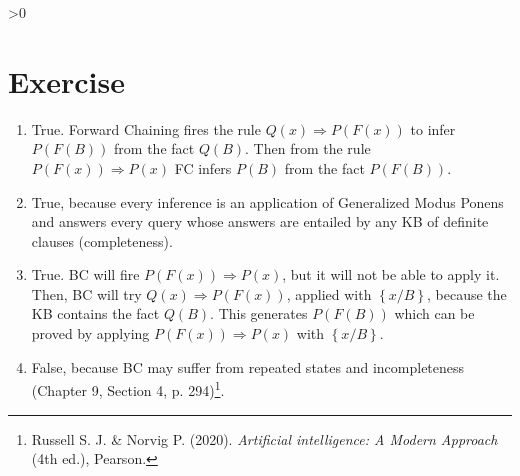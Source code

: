 \documentclass{article}
\newcounter{partCounter}
\newcounter{ExerciseCounter}
\newenvironment{Exercise}[1][-1]{
	\ifnum#1>0
	\setcounter{ExerciseCounter}{#1}
	\fi
	\section{Exercise \arabic{ExerciseCounter}}
	\setcounter{partCounter}{1}
}{
}
\begin{document}
\begin{Exercise}[3]
\begin{enumerate}
	\item True. Forward Chaining fires the rule $Q(x) \Rightarrow P(F(x))$ to infer $P(F(B))$ from the fact $Q(B)$. Then from the rule $P(F(x)) \Rightarrow P(x)$ FC infers $P(B)$ from the fact $P(F(B))$.
	
	\item True, because every inference is an application of Generalized Modus Ponens and answers every query whose answers are entailed by any KB of definite clauses (completeness).
	
	\item True. BC will fire $P(F(x)) \Rightarrow P(x)$, but it will not be able to apply it. Then, BC will try $Q(x) \Rightarrow P(F(x))$, applied with $\left\{ x / B \right\}$, because the KB contains the fact $Q(B)$. This generates $P(F(B))$ which can be proved by applying $P(F(x)) \Rightarrow P(x)$ with $\left\{ x / B \right\}$.
	
	\item False, because BC may suffer from repeated states and incompleteness (Chapter 9, Section 4, p. 294)\footnote{Russell S. J. \& Norvig P. (2020). \textit{Artificial intelligence: A Modern Approach} (4th ed.), Pearson.}. 
\end{enumerate}

\end{Exercise}

\newpage

\end{document}
